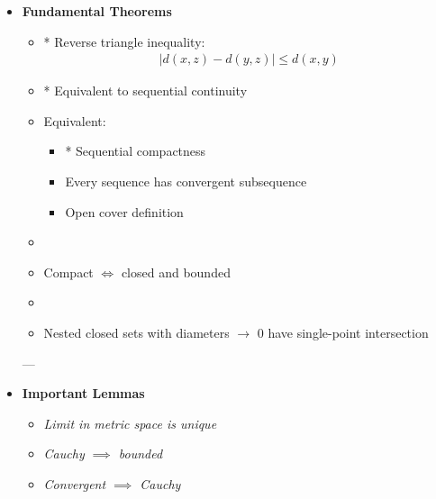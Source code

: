 \documentclass[12pt,a4paper]{report}
\begin{document}
\begin{description}
\begin{itemize}
---

    \item \textbf{Fundamental Theorems}

            \begin{itemize}
            \item \textit{}

  * Reverse triangle inequality:
    \begin{align*}
    |d(x,z)-d(y,z)| \le d(x,y)
    \end{align*}

            \item \textit{}

  * Equivalent to sequential continuity

            \item \textit{}
  Equivalent:

	\begin{itemize}
	\item  * Sequential compactness
 	\item  Every sequence has convergent subsequence
	\item   Open cover definition
	\end{itemize}

            \item \textit{}

	\item  Compact $\iff$ closed and bounded

            \item \textit{}

	\item  Nested closed sets with diameters $\to$ 0 have single-point intersection

            \end{itemize}
---

    \item \textbf{Important Lemmas}

            \begin{itemize}
            \item \textit{Limit in metric space is unique}
            \item \textit{Cauchy $\implies$ bounded}
            \item \textit{Convergent $\implies$ Cauchy}
            \end{itemize}
    \end{itemize}


\end{description}
\end{document}
